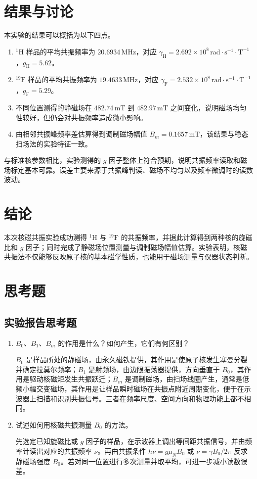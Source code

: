 \documentclass[12pt,a4paper]{article}
\begin{document}
\section{结果与讨论}
本实验的结果可以概括为以下四点。
\begin{enumerate}
    \item $^1\mathrm{H}$ 样品的平均共振频率为 $20.6934\,\mathrm{MHz}$，对应 $\gamma_{\mathrm{H}} = 2.692\times 10^8\,\mathrm{rad\cdot s^{-1}\cdot T^{-1}}$，$g_{\mathrm{H}} = 5.62$。
    \item $^{19}\mathrm{F}$ 样品的平均共振频率为 $19.4633\,\mathrm{MHz}$，对应 $\gamma_{\mathrm{F}} = 2.532\times 10^8\,\mathrm{rad\cdot s^{-1}\cdot T^{-1}}$，$g_{\mathrm{F}} = 5.29$。
    \item 不同位置测得的静磁场在 $482.74\,\mathrm{mT}$ 到 $482.97\,\mathrm{mT}$ 之间变化，说明磁场均匀性较好，但仍会对共振频率造成微小影响。
    \item 由相邻共振峰频率差估算得到调制磁场幅值 $B_m = 0.1657\,\mathrm{mT}$，该结果与稳态扫场法的实验特征一致。
\end{enumerate}

与标准核参数相比，实验测得的 $g$ 因子整体上符合预期，说明共振频率读取和磁场标定基本可靠。误差主要来源于共振峰判读、磁场不均匀以及频率微调时的读数波动。

\section{结论}
本次核磁共振实验成功测得 $^1\mathrm{H}$ 与 $^{19}\mathrm{F}$ 的共振频率，并据此计算得到两种核的旋磁比和 $g$ 因子；同时完成了静磁场位置测量与调制磁场幅值估算。实验表明，核磁共振法不仅能够反映原子核的基本磁学性质，也能用于磁场测量与仪器状态判断。

\section{思考题}
\subsection*{实验报告思考题}
\begin{enumerate}
    \item $B_0$、$B_1$、$B_m$ 的作用是什么？如何产生，它们有何区别？

    $B_0$ 是样品所处的静磁场，由永久磁铁提供，其作用是使原子核发生塞曼分裂并确定拉莫尔频率；$B_1$ 是射频场，由边限振荡器提供，方向垂直于 $B_0$，其作用是驱动核磁矩发生共振跃迁；$B_m$ 是调制磁场，由扫场线圈产生，通常是低频小幅交变磁场，其作用是让样品瞬时磁场在共振点附近周期变化，便于在示波器上扫描和识别共振信号。三者在频率尺度、空间方向和物理功能上都不相同。

    \item 试述如何用核磁共振测量 $B_0$ 的方法。

    先选定已知旋磁比或 $g$ 因子的样品，在示波器上调出等间距共振信号，并由频率计读出对应的共振频率 $\nu$。再由共振条件 $h\nu = g\mu_N B_0$ 或 $\nu = \gamma B_0 / 2\pi$ 反求静磁场强度 $B_0$。若对同一位置进行多次测量并取平均，可进一步减小读数误差。
\end{enumerate}
\end{document}
